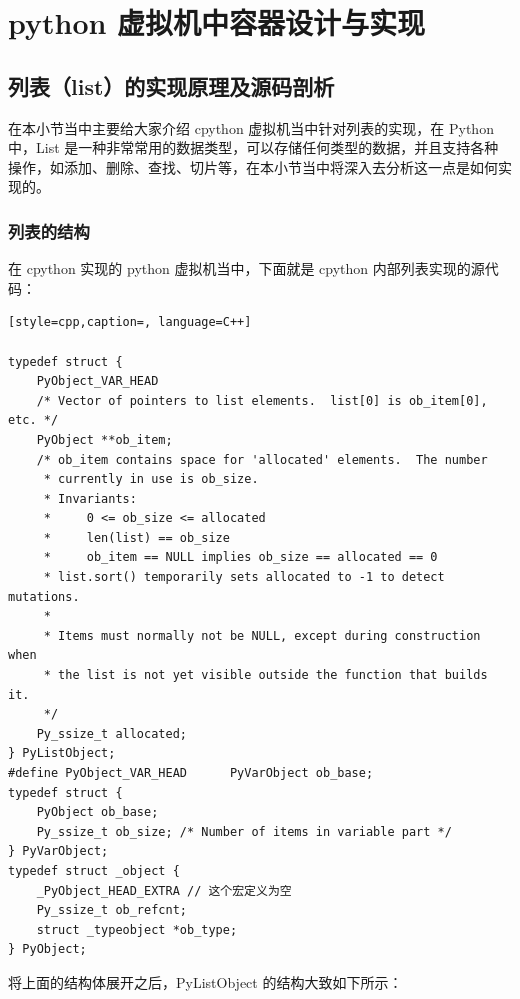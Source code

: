 \chapter{python 虚拟机中容器设计与实现}

\section{列表（list）的实现原理及源码剖析}
在本小节当中主要给大家介绍 cpython 虚拟机当中针对列表的实现，在 Python 中，List 是一种非常常用的数据类型，可以存储任何类型的数据，并且支持各种操作，如添加、删除、查找、切片等，在本小节当中将深入去分析这一点是如何实现的。
\subsection{列表的结构}
在 cpython 实现的 python 虚拟机当中，下面就是 cpython 内部列表实现的源代码：
\begin{lstlisting}[style=cpp,caption=, language=C++]

typedef struct {
    PyObject_VAR_HEAD
    /* Vector of pointers to list elements.  list[0] is ob_item[0], etc. */
    PyObject **ob_item;
    /* ob_item contains space for 'allocated' elements.  The number
     * currently in use is ob_size.
     * Invariants:
     *     0 <= ob_size <= allocated
     *     len(list) == ob_size
     *     ob_item == NULL implies ob_size == allocated == 0
     * list.sort() temporarily sets allocated to -1 to detect mutations.
     *
     * Items must normally not be NULL, except during construction when
     * the list is not yet visible outside the function that builds it.
     */
    Py_ssize_t allocated;
} PyListObject;
#define PyObject_VAR_HEAD      PyVarObject ob_base;
typedef struct {
    PyObject ob_base;
    Py_ssize_t ob_size; /* Number of items in variable part */
} PyVarObject;
typedef struct _object {
    _PyObject_HEAD_EXTRA // 这个宏定义为空
    Py_ssize_t ob_refcnt;
    struct _typeobject *ob_type;
} PyObject;
\end{lstlisting}
将上面的结构体展开之后，PyListObject 的结构大致如下所示：

